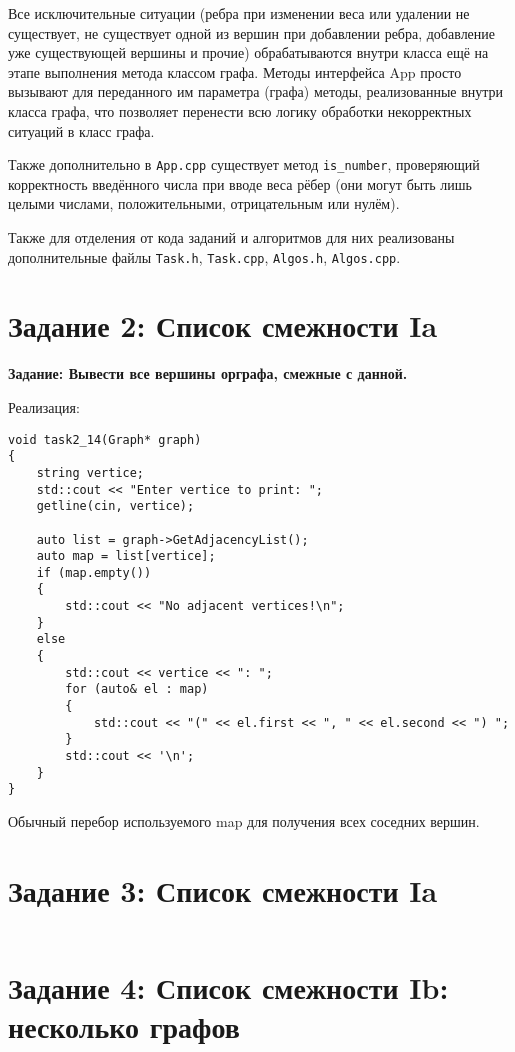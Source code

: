 \documentclass[otchet]{SCWorks}
\begin{document}
Все исключительные ситуации (ребра при изменении веса или удалении не существует, не существует одной из вершин при добавлении ребра, добавление уже существующей вершины и прочие) обрабатываются внутри класса ещё на этапе выполнения метода классом графа. Методы интерфейса App просто вызывают для переданного им параметра (графа) методы, реализованные внутри класса графа, что позволяет перенести всю логику обработки некорректных ситуаций в класс графа.

Также дополнительно в \texttt{App.cpp} существует метод \texttt{is_number}, проверяющий корректность введённого числа при вводе веса рёбер (они могут быть лишь целыми числами, положительными, отрицательным или нулём).

Также для отделения от кода заданий и алгоритмов для них реализованы дополнительные файлы \texttt{Task.h}, \texttt{Task.cpp}, \texttt{Algos.h}, \texttt{Algos.cpp}.

\section{Задание 2: Список смежности Ia}

\textbf{Задание: Вывести все вершины орграфа, смежные с данной.}

Реализация:

\begin{verbatim}
void task2_14(Graph* graph)
{
	string vertice;
	std::cout << "Enter vertice to print: ";
	getline(cin, vertice);

	auto list = graph->GetAdjacencyList();
	auto map = list[vertice];
	if (map.empty())
	{
		std::cout << "No adjacent vertices!\n";
	}
	else
	{
		std::cout << vertice << ": ";
		for (auto& el : map)
		{
			std::cout << "(" << el.first << ", " << el.second << ") ";
		}
		std::cout << '\n';
	}
}
\end{verbatim}

Обычный перебор используемого map для получения всех соседних вершин.

\section{Задание 3: Список смежности Ia}

\begin{verbatim}
\end{verbatim}

\section{Задание 4: Список смежности Ib: несколько графов}
\end{document}
